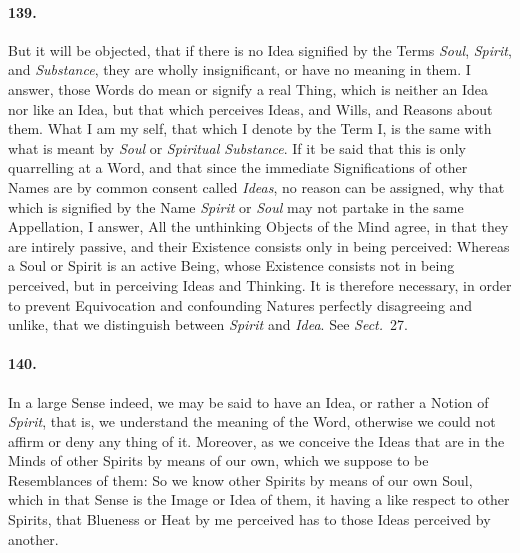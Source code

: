 \documentclass[]{article}
\newenvironment{sectionbody}{}{}
\begin{document}
\begin{sectionbody}
\paragraph{139.}  But it will be objected, that if there is no Idea
signified by the Terms \emph{Soul}, \emph{Spirit}, and
\emph{Substance}, they are wholly insignificant, or have no
meaning in them.  I answer, those Words do mean or signify a real
Thing, which is neither an Idea nor like an Idea, but that which
perceives Ideas, and Wills, and Reasons about them.  What I am my
self, that which I denote by the Term I, is the same with what is
meant by \emph{Soul} or \emph{Spiritual Substance}.  If it be
said that this is only quarrelling at a Word, and that since the
immediate Significations of other Names are by common consent
called \emph{Ideas}, no reason can be assigned, why that which is
signified by the Name \emph{Spirit} or \emph{Soul} may not
partake in the same Appellation, I answer, All the unthinking
Objects of the Mind agree, in that they are intirely passive, and
their Existence consists only in being perceived: Whereas a Soul
or Spirit is an active Being, whose Existence consists not in
being perceived, but in perceiving Ideas and Thinking.  It is
therefore necessary, in order to prevent Equivocation and
confounding Natures perfectly disagreeing and unlike, that we
distinguish between \emph{Spirit} and \emph{Idea}.  See
\emph{Sect.}~27.



\paragraph{140.} In a large Sense indeed, we may be said to have an Idea, or
rather a Notion of \emph{Spirit}, that is, we understand the
meaning of the Word, otherwise we could not affirm or deny any
thing of it.  Moreover, as we conceive the Ideas that are in the
Minds of other Spirits by means of our own, which we suppose to
be Resemblances of them: So we know other Spirits by means of our
own Soul, which in that Sense is the Image or Idea of them, it
having a like respect to other Spirits, that Blueness or Heat by
me perceived has to those Ideas perceived by another.




\end{sectionbody}
\end{document}
